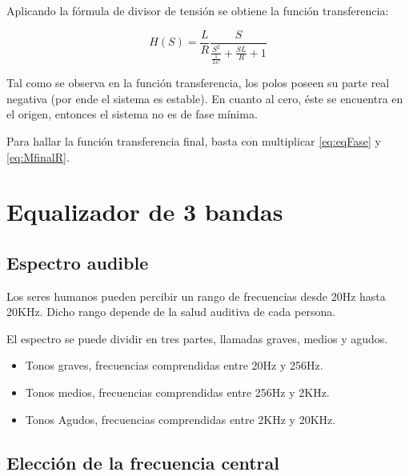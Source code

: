 \documentclass[../../tc_tp3_main.tex]{subfiles}
\begin{document}
Aplicando la f\'ormula de divisor de tensi\'on se obtiene la funci\'on transferencia:

\begin{equation}
H(S)=\frac{L}{R}\frac{S}{\frac{S^2}{\frac{1}{LC}}+\frac{SL}{R} +1}\label{eq:eqFase}
\end{equation}

Tal como se observa en la función transferencia, los polos poseen su parte real negativa (por ende el sistema es estable). En cuanto al cero, \'este se encuentra en el origen, entonces el sistema no es de fase mínima.
\par
Para hallar la función transferencia final, basta con multiplicar \ref{eq:eqFase} y \ref{eq:MfinalR}.















\section{Equalizador de 3 bandas}

\subsection{Espectro audible}
Los seres humanos pueden percibir un rango de frecuencias desde 20Hz hasta 20KHz. Dicho rango depende de la salud auditiva de cada persona.
\par 
 El espectro se puede dividir en tres partes, llamadas graves, medios y agudos.

\begin{itemize}
  \item Tonos graves, frecuencias comprendidas entre 20Hz y 256Hz.
  \item Tonos medios, frecuencias comprendidas entre 256Hz y 2KHz.
  \item Tonos Agudos, frecuencias comprendidas entre 2KHz y 20KHz.
\end{itemize}
\subsection{Elección de la frecuencia central}
\end{document}
